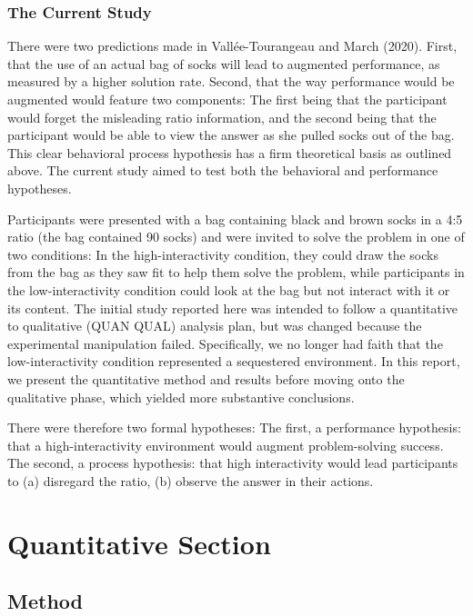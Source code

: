 \hypertarget{the-current-study}{%
\subsubsection{The Current Study}\label{the-current-study}}

There were two predictions made in Vallée-Tourangeau and March (2020).
First, that the use of an actual bag of socks will lead to augmented
performance, as measured by a higher solution rate. Second, that the way
performance would be augmented would feature two components: The first
being that the participant would forget the misleading ratio
information, and the second being that the participant would be able to
view the answer as she pulled socks out of the bag. This clear
behavioral process hypothesis has a firm theoretical basis as outlined
above. The current study aimed to test both the behavioral and
performance hypotheses.

Participants were presented with a bag containing black and brown socks
in a 4:5 ratio (the bag contained 90 socks) and were invited to solve
the problem in one of two conditions: In the high-interactivity
condition, they could draw the socks from the bag as they saw fit to
help them solve the problem, while participants in the low-interactivity
condition could look at the bag but not interact with it or its content.
The initial study reported here was intended to follow a quantitative to
qualitative (QUAN QUAL) analysis plan, but was changed because the
experimental manipulation failed. Specifically, we no longer had faith
that the low-interactivity condition represented a sequestered
environment. In this report, we present the quantitative method and
results before moving onto the qualitative phase, which yielded more
substantive conclusions.

There were therefore two formal hypotheses: The first, a performance
hypothesis: that a high-interactivity environment would augment
problem-solving success. The second, a process hypothesis: that high
interactivity would lead participants to (a) disregard the ratio, (b)
observe the answer in their actions.

\hypertarget{quantitative-section}{%
\section{Quantitative Section}\label{quantitative-section}}

\hypertarget{method}{%
\subsection{Method}\label{method}}

